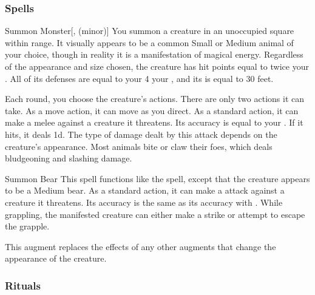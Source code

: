 \subsubsection{Spells}


\lowercase{\hypertarget{spell:Summon Monster}{}}\label{spell:Summon Monster}
\begin{ability}[\nth{1}]{\hypertarget{spell:Summon Monster}{Summon Monster}}[,  (minor)]
You summon a creature in an unoccupied square within \rngmed range.
It visually appears to be a common Small or Medium animal of your choice, though in reality it is a manifestation of magical energy.
Regardless of the appearance and size chosen, the creature has hit points equal to twice your .
All of its defenses are equal to your 4 \add your , and its  is equal to 30 feet.

Each round, you choose the creature's actions.
There are only two actions it can take.
As a move action, it can move as you direct.
As a standard action, it can make a melee  against a creature it threatens.
Its accuracy is equal to your .
If it hits, it deals  \minus1d.
The type of damage dealt by this attack depends on the creature's appearance.
Most animals bite or claw their foes, which deals bludgeoning and slashing damage.
\end{ability}
\vspace{0.25em}



\lowercase{\hypertarget{spell:Summon Bear}{}}\label{spell:Summon Bear}
\begin{ability}[\nth{2}]{\hypertarget{spell:Summon Bear}{Summon Bear}}
This spell functions like the  spell, except that the creature appears to be a Medium bear.
As a standard action, it can make a  attack against a creature it threatens.
Its accuracy is the same as its accuracy with .
While grappling, the manifested creature can either make a strike or attempt to escape the grapple.

This augment replaces the effects of any other augments that change the appearance of the creature.
\end{ability}
\vspace{0.25em}



\subsubsection{Rituals}



